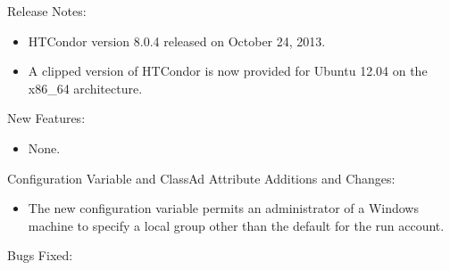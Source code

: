 \noindent Release Notes:

\begin{itemize}

\item HTCondor version 8.0.4 released on October 24, 2013.

\item A clipped version of HTCondor is now provided for Ubuntu 12.04 
on the x86\_64 architecture.

\end{itemize}


\noindent New Features:

\begin{itemize}

\item None.

\end{itemize}

\noindent Configuration Variable and ClassAd Attribute Additions and Changes:

\begin{itemize}

\item The new configuration variable 
permits an administrator of a Windows machine to specify a local group other 
than the default  for the  run account.

\end{itemize}

\noindent Bugs Fixed:

